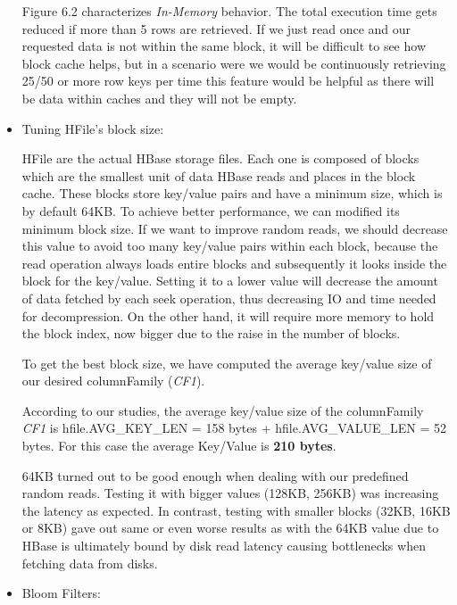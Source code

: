 \begin{itemize}
Figure 6.2 characterizes \textit{In-Memory} behavior. The total execution time gets reduced if more than 5 rows are retrieved. If we just read once and our requested data is not within the same block, it will be difficult to see how block cache helps, but in a scenario were we would be continuously retrieving 25/50 or more row keys per time this feature would be helpful as there will be data within caches and they will not be empty. 


\item Tuning HFile's block size:
\par
HFile are the actual HBase storage files. Each one is composed of blocks which are the smallest unit of data HBase reads and places in the block cache. These blocks store key/value pairs and have a minimum size, which is by default 64KB. To achieve better performance, we can modified its minimum block size. If we want to improve random reads, we should decrease this value to avoid too many key/value pairs within each block, because the read operation always loads entire blocks and subsequently it looks inside the block for the key/value. Setting it to a lower value will decrease the amount of data fetched by each seek operation, thus decreasing IO and time needed for decompression. On the other hand, it will require more memory to hold the block index, now bigger due to the raise in the number of blocks.

\bigskip

To get the best block size, we have computed the average key/value size of our desired columnFamily (\textit{CF1}).
\par
According to our studies, the average key/value size of the columnFamily \textit{CF1} is hfile.AVG\_KEY\_LEN = 158 bytes + hfile.AVG\_VALUE\_LEN = 52 bytes. For this case the average Key/Value is \textbf{210 bytes}.
\par
64KB turned out to be good enough when dealing with our predefined random reads. Testing it with bigger values (128KB, 256KB) was increasing the latency as expected. In contrast, testing with smaller blocks (32KB, 16KB or 8KB) gave out same or even worse results as with the 64KB value due to HBase is ultimately bound by disk read latency causing bottlenecks when fetching data from disks.


\item Bloom Filters:


\end{itemize}
